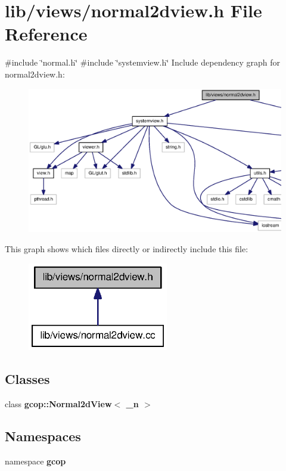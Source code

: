 \section{lib/views/normal2dview.h \-File \-Reference}
\label{normal2dview_8h}
{\ttfamily \#include \char`\"{}normal.\-h\char`\"{}}\*
{\ttfamily \#include \char`\"{}systemview.\-h\char`\"{}}\*
\-Include dependency graph for normal2dview.\-h\-:
\nopagebreak
\begin{figure}[H]
\begin{center}
\leavevmode
\includegraphics[width=350pt]{normal2dview_8h__incl}
\end{center}
\end{figure}
\-This graph shows which files directly or indirectly include this file\-:
\nopagebreak
\begin{figure}[H]
\begin{center}
\leavevmode
\includegraphics[width=174pt]{normal2dview_8h__dep__incl}
\end{center}
\end{figure}
\subsection*{\-Classes}
\begin{DoxyCompactItemize}
\item 
class {\bf gcop\-::\-Normal2d\-View$<$ \-\_\-n $>$}
\end{DoxyCompactItemize}
\subsection*{\-Namespaces}
\begin{DoxyCompactItemize}
\item 
namespace {\bf gcop}
\end{DoxyCompactItemize}
